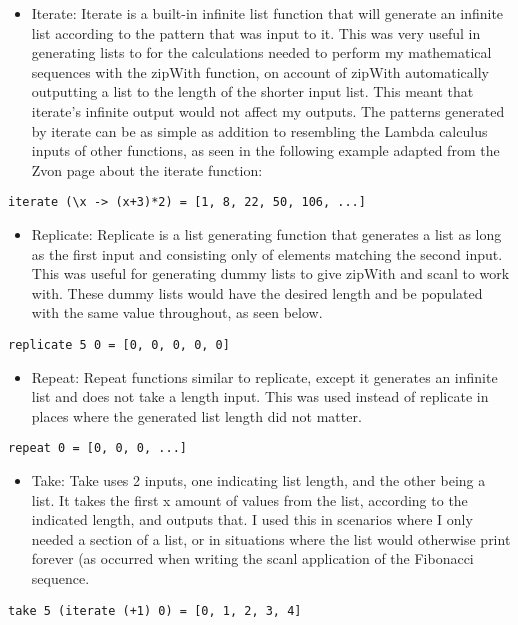 \documentclass{article}
\theoremstyle{theorem}
\theoremstyle{definition}
\theoremstyle{remark}
\begin{document}
\begin{itemize}
\item Iterate: Iterate is a built-in infinite list function that will generate an infinite list according to the pattern that was input to it. This was very useful in generating lists to for the calculations needed to perform my mathematical sequences with the zipWith function, on account of zipWith automatically outputting a list to the length of the shorter input list. This meant that iterate's infinite output would not affect my outputs. The patterns generated by iterate can be as simple as addition to resembling the Lambda calculus inputs of other functions, as seen in the following example adapted from the Zvon page about the iterate function:
\end{itemize}
\begin{lstlisting}
iterate (\x -> (x+3)*2) = [1, 8, 22, 50, 106, ...]
\end{lstlisting}
\begin{itemize}
\item Replicate: Replicate is a list generating function that generates a list as long as the first input and consisting only of elements matching the second input. This was useful for generating dummy lists to give zipWith and scanl to work with. These dummy lists would have the desired length and be populated with the same value throughout, as seen below.
\end{itemize}
\begin{lstlisting}
replicate 5 0 = [0, 0, 0, 0, 0]
\end{lstlisting}
\begin{itemize} 
\item Repeat: Repeat functions similar to replicate, except it generates an infinite list and does not take a length input. This was used instead of replicate in places where the generated list length did not matter.
\end{itemize}
\begin{lstlisting}
repeat 0 = [0, 0, 0, ...]
\end{lstlisting}
\begin{itemize}
\item Take: Take uses 2 inputs, one indicating list length, and the other being a list. It takes the first x amount of values from the list, according to the indicated length, and outputs that. I used this in scenarios where I only needed a section of a list, or in situations where the list would otherwise print forever (as occurred when writing the scanl application of the Fibonacci sequence.
\end{itemize}
\begin{lstlisting}
take 5 (iterate (+1) 0) = [0, 1, 2, 3, 4]
\end{lstlisting}
\end{document}
